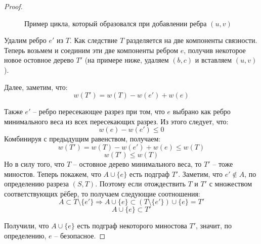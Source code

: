 \begin{proof}
\begin{figure}
\begin{tikzpicture}
        \end{tikzpicture} 

        \caption{Пример цикла, который образовался при добавлении ребра $(u, v)$}
    \end{figure}

    Удалим ребро $e'$ из $T$. Как следствие $T$ разделяется на две компоненты связности. Теперь возьмем и соединим эти две компоненты ребром $e$, получив некоторое новое остовное дерево $T'$ (на примере ниже, удаляем $(b, c)$ и вставляем $(u, v)$).

    Далее, заметим, что:
    \begin{equation*}
        w(T') = w(T) - w(e') + w(e)
    \end{equation*}

    Также $e'$ -- ребро пересекающее разрез при том, что $e$ выбрано как ребро минимального веса из всех пересекающих разрез. Из этого следует, что:
    \begin{equation*}
        w(e) - w(e') \leq 0
    \end{equation*}
    Комбинируя с предыдущим равенством, получаем:
    \begin{equation*}
        w(T') = w(T) - w(e') + w(e) \leq w(T)
    \end{equation*}
    \begin{equation*}
        w(T') \leq w(T)
    \end{equation*}
    Но в силу того, что $T$ -- остовное дерево минимального веса, то $T'$ -- тоже миностов. Теперь покажем, что $A \cup \{e\}$ есть подграф $T'$.
    Заметим, что $e' \not\in A$, по определению разреза $(S, T)$. Поэтому если отождествить $T$ и $T'$ с множеством соответствующих рёбер, то получаем следующие соотношения:
    \begin{equation*}
        A \subset T \setminus \{ e' \} \Rightarrow A \cup \{ e \} \subset (T \setminus \{e'\}) \cup \{ e \} = T'
    \end{equation*}
    \begin{equation*}
        A \cup \{ e \} \subset T'
    \end{equation*}

    Получили, что $A \cup \{e\}$ есть подграф некоторого миностова $T'$, значит, по определению, $e$ -- безопасное.

\end{proof}
